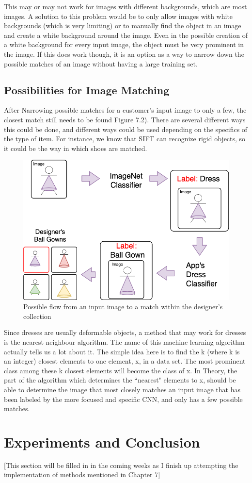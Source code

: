 \documentclass[12pt]{report} %
\begin{document}
	This may or may not work for images with different backgrounds, which are most images. A solution to this problem would be to only allow images with white backgrounds (which is very limiting) or to manually find the object in an image and create a white background around the image. Even in the possible creation of a white background for every input image, the object must be very prominent in the image.  If this does work though, it is an option as a way to narrow down the possible matches of an image without having a large training set.
	
\section{Possibilities for Image Matching}
	After Narrowing possible matches for a customer's input image to only a few, the closest match still needs to be found Figure 7.2). There are several different ways this could be done, and different ways could be used depending on the specifics of the type of item. For instance, we know that SIFT\cite{lowe1999object} can recognize rigid objects, so it could be the way in which shoes are matched. 
\begin{figure}
\centering
\includegraphics[width=6in]{app_flow}
\caption{Possible flow from an input image to a match within the designer's collection}
\end{figure}		
	
	Since dresses are usually deformable objects, a method that may work for dresses is the nearest neighbour algorithm. The name of this machine learning algorithm actually tells us a lot about it. The simple idea here is to find the k (where k is an integer) closest elements to one element, x,  in a data set. The most prominent class among these k closest elements will become the class of x. In Theory, the part of the algorithm which determines the ``nearest" elements to x, should be able to determine the image that most closely matches an input image that has been labeled by the more focused and specific CNN, and only has a few possible matches.\cite{nearestNeighbour}

\chapter{Experiments and Conclusion}
[This section will be filled in in the coming weeks as I finish up attempting the implementation of methods mentioned in Chapter 7]
		


\end{document}
